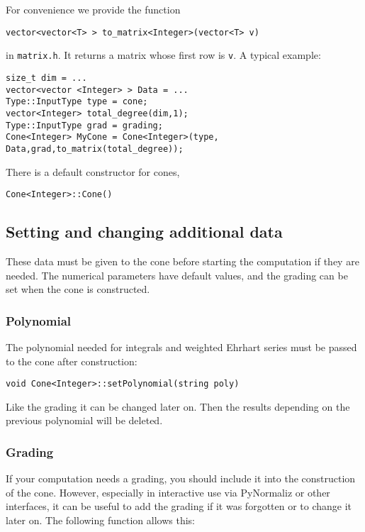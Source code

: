 \documentclass[12pt,a4paper]{scrartcl}
\theoremstyle{definition}
\begin{document}
\begin{small}
For convenience we provide the function
\begin{Verbatim}
vector<vector<T> > to_matrix<Integer>(vector<T> v)
\end{Verbatim}
in \verb|matrix.h|. It returns a matrix whose first row is \verb|v|. A typical example:
\begin{Verbatim}
size_t dim = ...
vector<vector <Integer> > Data = ...
Type::InputType type = cone;
vector<Integer> total_degree(dim,1);
Type::InputType grad = grading;
Cone<Integer> MyCone = Cone<Integer>(type, Data,grad,to_matrix(total_degree));
\end{Verbatim}

There is a default constructor for cones,
\begin{Verbatim}
Cone<Integer>::Cone()
\end{Verbatim}

\subsection{Setting and changing additional data}

These data must be given to the cone before starting the computation if they are needed. 
The numerical parameters have default values, and the grading can be set when the cone is constructed.

\subsubsection{Polynomial}

The polynomial needed for integrals and weighted Ehrhart series must be passed to the cone after construction:
\begin{Verbatim}
void Cone<Integer>::setPolynomial(string poly)
\end{Verbatim}

Like the grading it can be changed later on. Then the results depending on the previous polynomial will be deleted.

\subsubsection{Grading}

If your computation needs a grading, you should include it into the construction of the cone. However, especially in interactive use via PyNormaliz or other interfaces, it can be useful to add the grading if it was forgotten or to change it later on. The following function allows this:


\end{small}
\end{document}
